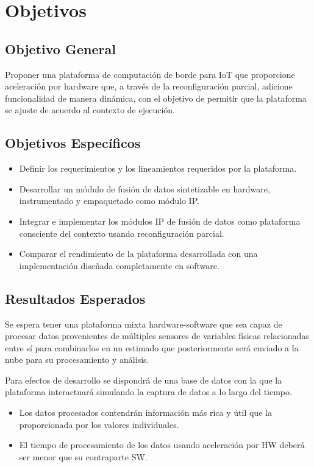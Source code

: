 
\chapter{Objetivos} %
\label{Chapter3}

\section{Objetivo General}

Proponer una plataforma de computación de borde para IoT que proporcione aceleración por hardware que, a través de la reconfiguración parcial, adicione funcionalidad de manera dinámica, con el objetivo de permitir que la plataforma se ajuste de acuerdo al contexto de ejecución.

\section{Objetivos Específicos}
\begin{itemize}
\item Definir los requerimientos y los lineamientos requeridos por la plataforma. 
\item Desarrollar un módulo de fusión de datos sintetizable en hardware, instrumentado y empaquetado como módulo IP. 
\item Integrar e implementar los módulos IP de fusión de datos como plataforma consciente del contexto usando reconfiguración parcial. 
\item Comparar el rendimiento de la plataforma desarrollada con una implementación diseñada completamente en software. 
\end{itemize}

\clearpage
\section{Resultados Esperados}
Se espera tener una plataforma mixta hardware-software que sea capaz de procesar datos provenientes de múltiples sensores de variables físicas relacionadas entre sí para combinarlos en un estimado que posteriormente será enviado a la nube para su procesamiento y análisis.

Para efectos de desarrollo se dispondrá de una base de datos con la que la plataforma interactuará simulando la captura de datos a lo largo del tiempo.

\begin{itemize}
\item Los datos procesados contendrán información más rica y útil que la proporcionada por los valores individuales.
\item El tiempo de procesamiento de los datos usando aceleración por HW deberá ser menor que su contraparte SW.
\end{itemize}
